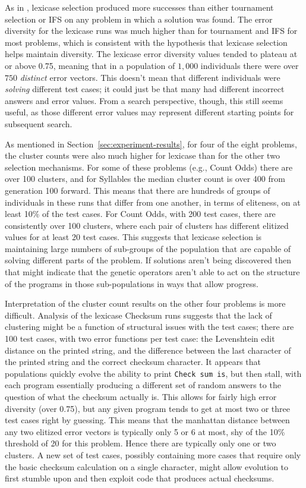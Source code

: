 As in \cite{Helmuth:2015:GECCO}, lexicase selection produced more successes than 
either tournament selection or IFS on any problem in which a solution was found. 
The error diversity for the lexicase runs was much higher than for tournament
 and IFS for most problems, which is consistent with the hypothesis that
lexicase selection helps maintain diversity. The lexicase error diversity values tended to
plateau at or above 0.75, meaning that in a population of $1,000$ individuals there were over $750$
\emph{distinct} error vectors. This doesn't mean that different individuals were \emph{solving}
different test cases; it could just be that many had different incorrect
answers and error values. From a search perspective, though, this still seems useful, as those different
error values may represent different starting points for subsequent search.

As mentioned in Section~\ref{sec:experiment-results}, for four of the eight problems, the cluster counts were
also much higher for lexicase than for the other two selection mechanisms. For some of these problems
(e.g., Count Odds) there are over 100 clusters, and for Syllables the median cluster count is over 400
from generation 100 forward. This means that there are hundreds of groups of individuals in these runs
that differ from one another, in terms of eliteness, on at least 10\%
of the test cases. For Count Odds, with 200 test cases, there are consistently over
100 clusters, where each pair of clusters has different elitized values for at least 20 test cases.
This suggests that lexicase selection is maintaining large numbers of sub-groups of the population that are 
capable of solving different parts of the problem. If solutions aren't being discovered then 
that might indicate that the genetic operators aren't able to act on the structure 
of the programs in those sub-populations in ways that allow progress.

Interpretation of the cluster count results on the other four problems is more difficult. Analysis
of the lexicase Checksum runs suggests that the lack of clustering might be a function
of structural issues with the test cases; 
there are 100 test cases, with two error functions per test case:  the Levenshtein edit distance on the printed string, and the difference between the last character of the printed string and the correct checksum character.
It appears that populations quickly evolve the ability to print \texttt{Check sum is}, but
then stall, with each program essentially producing a different set of random answers to the question
of what the checksum actually is. This allows for fairly high error diversity (over 0.75), but any given program tends to  get at most two or three test 
cases right by guessing. This means that the manhattan distance between any two elitized error vectors
is typically only 5 or 6 at most, shy of the 10\% threshold of 20 for this problem. Hence there are typically only one or two clusters. 
A new set of test cases, possibly containing more cases that require only the basic checksum calculation
on a single character, might allow evolution to first stumble upon and then exploit code that produces actual checksums.

